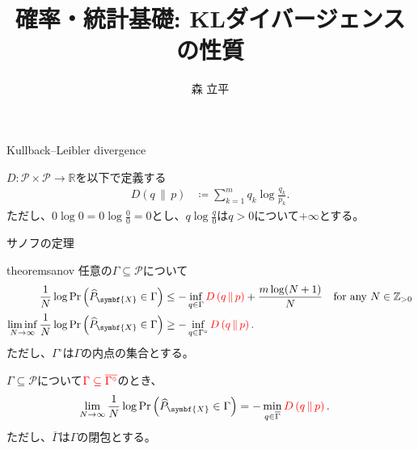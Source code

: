\documentclass[lualatex,handout]{beamer}
\title{確率・統計基礎: KLダイバージェンスの性質}
\author{森 立平}
\date{}
\newcommand{\mycolor}[2]{%
  \begingroup
  \colorlet{currentcolor}{.}%
  \color{#1}#2%
  \color{currentcolor}%
  \endgroup
}
\newcommand{\emm}[1]{\mycolor{red}{#1}}
\newcommand\KL[2]{D\left(#1\,\|\,#2\right)}
\theoremstyle{definition}
\begin{document}
\begin{frame}[plain]
\maketitle
\end{frame}


\begin{frame}{Kullback--Leibler divergence}
\begin{definition}
$D\colon \mathcal{P}\times\mathcal{P}\to\mathbb{R}$を以下で定義する
\begin{align*}
\KL{q}{p} &\coloneq \sum_{k=1}^m q_k\log \frac{q_k}{p_k}.
\end{align*}
ただし、$0\log 0 = 0\log\frac{0}{0}=0$とし、$q\log\frac{q}{0}$は$q>0$について$+\infty$とする。
\end{definition}
\end{frame}

\begin{frame}{サノフの定理}
\begin{restatable}[サノフの定理]{theorem}{sanov}
\footnotesize
任意の$\Gamma\subseteq\mathcal{P}$について
\begin{align*}
\frac1N\log\Pr\left(\widehat{P}_{\symbf{X}} \in \Gamma\right) &\le -\inf_{q\in \Gamma} \emm{\KL{q}{p}} + \frac{m\log(N+1)}N\quad\text{for any $N\in\mathbb{Z}_{>0}$}\\
\liminf_{N\to\infty}\frac1N\log \Pr\left(\widehat{P}_{\symbf{X}} \in \Gamma\right) &\ge -\inf_{q\in \Gamma^\circ} \emm{\KL{q}{p}}.
\end{align*}
ただし、$\Gamma^\circ$は$\Gamma$の内点の集合とする。
\end{restatable}
\begin{corollary}
\footnotesize
$\Gamma\subseteq\mathcal{P}$について$\emm{\Gamma\subseteq\overline{\Gamma^\circ}}$のとき、
\begin{align*}
\lim_{N\to\infty}\frac1N\log \Pr\left(\widehat{P}_{\symbf{X}} \in \Gamma\right) &= -\min_{q\in \overline{\Gamma}} \emm{\KL{q}{p}}.
\end{align*}
ただし、$\overline{\Gamma}$は$\Gamma$の閉包とする。
\end{corollary}
\end{frame}
\end{document}
